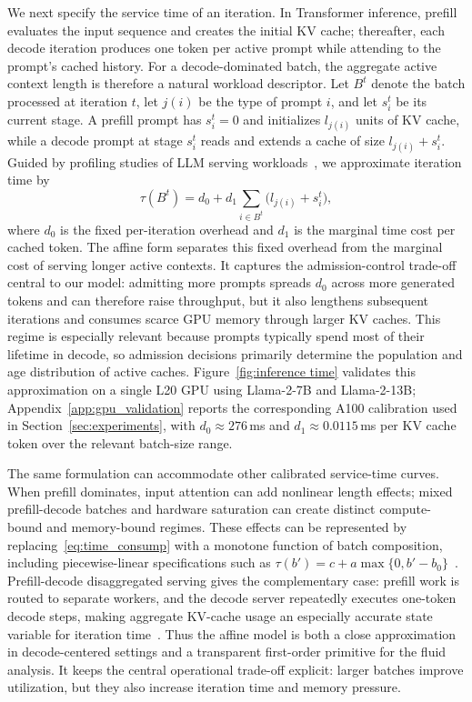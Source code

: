 We next specify the service time of an iteration. In Transformer inference, prefill evaluates the input sequence and creates the initial KV cache; thereafter, each decode iteration produces one token per active prompt while attending to the prompt's cached history. For a decode-dominated batch, the aggregate active context length is therefore a natural workload descriptor. Let \(B^t\) denote the batch processed at iteration \(t\), let \(j(i)\) be the type of prompt \(i\), and let \(s_i^t\) be its current stage. A prefill prompt has \(s_i^t=0\) and initializes \(l_{j(i)}\) units of KV cache, while a decode prompt at stage \(s_i^t\) reads and extends a cache of size \(l_{j(i)}+s_i^t\). Guided by profiling studies of LLM serving workloads~\citep{agrawal2023sarathi,kwon2023efficient,zhong2024distserve}, we approximate iteration time by
\begin{equation}
\label{eq:time_consump}
    \tau(B^t) = d_0 + d_1 \sum_{i\in B^t} \bigl(l_{j(i)} + s_i^t\bigr),
\end{equation}
where \( d_0 \) is the fixed per-iteration overhead and \( d_1 \) is the marginal time cost per cached token. The affine form separates this fixed overhead from the marginal cost of serving longer active contexts. It captures the admission-control trade-off central to our model: admitting more prompts spreads \(d_0\) across more generated tokens and can therefore raise throughput, but it also lengthens subsequent iterations and consumes scarce GPU memory through larger KV caches. This regime is especially relevant because prompts typically spend most of their lifetime in decode, so admission decisions primarily determine the population and age distribution of active caches. Figure~\ref{fig:inference time} validates this approximation on a single L20 GPU using Llama-2-7B and Llama-2-13B; Appendix~\ref{app:gpu_validation} reports the corresponding A100 calibration used in Section~\ref{sec:experiments}, with \( d_0 \approx 276 \)\,ms and \( d_1 \approx 0.0115 \)\,ms per KV cache token over the relevant batch-size range.

The same formulation can accommodate other calibrated service-time curves. When prefill dominates, input attention can add nonlinear length effects; mixed prefill-decode batches and hardware saturation can create distinct compute-bound and memory-bound regimes. These effects can be represented by replacing~\eqref{eq:time_consump} with a monotone function of batch composition, including piecewise-linear specifications such as \(\tau(b') = c + a\max\{0,b'-b_0\}\)~\citep{li2025throughput}. Prefill-decode disaggregated serving gives the complementary case: prefill work is routed to separate workers, and the decode server repeatedly executes one-token decode steps, making aggregate KV-cache usage an especially accurate state variable for iteration time~\citep{patel2024splitwise,zhong2024distserve}. Thus the affine model is both a close approximation in decode-centered settings and a transparent first-order primitive for the fluid analysis. It keeps the central operational trade-off explicit: larger batches improve utilization, but they also increase iteration time and memory pressure.

